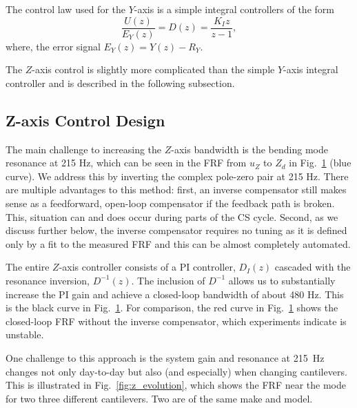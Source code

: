 \documentclass[twocolumn,twoside]{IEEEtran/IEEEtran}
\begin{document}
The control law used for the $Y$-axis is a simple integral controllers of the
form
\begin{equation}
  \frac{U(z)}{E_Y(z)}=D(z) = \frac{K_Iz}{z-1},
  \label{eqn:dzI}
\end{equation}
where, the error signal $E_Y(z) = Y(z)-R_Y$.


The $Z$-axis control is slightly more complicated than the simple $Y$-axis
integral controller and is described in the following subsection.
\subsection{Z-axis Control Design}\label{sec:zaxis_cs_control}
The main challenge to increasing the $Z$-axis bandwidth is the bending mode
resonance at 215 Hz, which can be seen in the FRF from $u_Z$ to $Z_{d}$ in
Fig.~\ref{fig:z_control} (blue curve). We address this by inverting the complex
pole-zero pair at 215 Hz. There are multiple advantages to this method: first,
an inverse compensator still makes sense as a feedforward, open-loop compensator
if the feedback path is broken. This, situation can and does occur during parts
of the CS cycle. Second, as we discuss further below, the inverse compensator
requires no tuning as it is defined only by a fit to the measured FRF and this
can be almost completely automated.

\begin{figure}[t!]
  \centering
  
  \caption{}
  \label{fig:z_control}
\end{figure}
The entire $Z$-axis controller consists of a PI controller, $D_I(z)$ cascaded
with the resonance inversion, $D^{-1}(z)$. The inclusion of $D^{-1}$ allows us
to substantially increase the PI gain and achieve a closed-loop bandwidth of
about 480 Hz. This is the black curve in Fig.~\ref{fig:z_control}. For
comparison, the red curve in Fig.~\ref{fig:z_control} shows the closed-loop FRF
without the inverse compensator, which experiments indicate is unstable.

One challenge to this approach is the system gain and resonance at 215~Hz
changes not only day-to-day but also (and especially) when changing cantilevers.
This is illustrated in Fig.~\ref{fig:z_evolution}, which shows the FRF near the
mode for two three different cantilevers. Two are of the same make and model.
\end{document}
